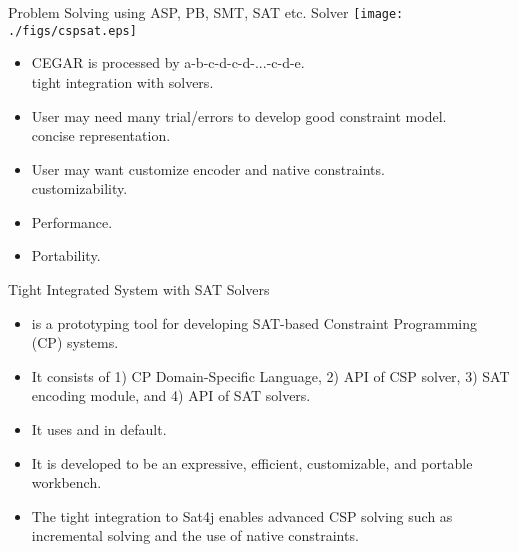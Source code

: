 \documentclass{beamer}
\begin{document}
\begin{frame}{Problem Solving using ASP, PB, SMT, SAT etc. Solver}
  \centering
  \texttt{[image: ./figs/cspsat.eps]}
    \begin{itemize}[<+->]
    \item CEGAR is processed by a-b-c-d-c-d-...-c-d-e.\\
      \alert{tight integration with solvers}.
    \item User may need many trial/errors to develop good constraint model.\\
      \alert{concise representation}.
    \item User may want customize encoder and native constraints.\\
      \alert{customizability}.
    \item \alert{Performance}. 
    \item \alert{Portability}. 
    \end{itemize}
\end{frame}

\begin{frame}{Tight Integrated System with SAT Solvers}
\begin{itemize}
\item {} is a prototyping tool for developing SAT-based Constraint Programming (CP) systems.
\item <2-> It consists of 1) CP Domain-Specific Language, 2) API of CSP solver, 3) SAT encoding module, and 4) API of SAT solvers.
\item <2-> It uses  and  in default.
\end{itemize}
    \centering
{}

\begin{itemize}
\item<7-> It is developed to be an expressive, efficient, customizable, and portable workbench.
\item<8-> The tight integration to \textsf{Sat4j} enables advanced CSP
  solving such as incremental solving and the use of native constraints. 
\end{itemize}
\end{frame}
\end{document}
